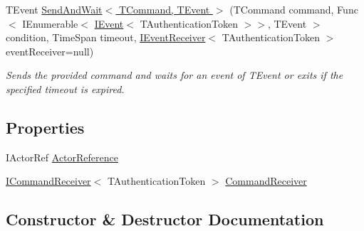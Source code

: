 \begin{DoxyCompactItemize}
T\+Event \hyperlink{classCqrs_1_1Akka_1_1Commands_1_1ConcurrentAkkaCommandSender_afda9034e20ed82cd3742f1489ebe1b3a_afda9034e20ed82cd3742f1489ebe1b3a}{Send\+And\+Wait$<$ T\+Command, T\+Event $>$} (T\+Command command, Func$<$ I\+Enumerable$<$ \hyperlink{interfaceCqrs_1_1Events_1_1IEvent}{I\+Event}$<$ T\+Authentication\+Token $>$$>$, T\+Event $>$ condition, Time\+Span timeout, \hyperlink{interfaceCqrs_1_1Events_1_1IEventReceiver}{I\+Event\+Receiver}$<$ T\+Authentication\+Token $>$ event\+Receiver=null)
\begin{DoxyCompactList}\small\item\em Sends the provided {\itshape command}  and waits for an event of {\itshape T\+Event}  or exits if the specified timeout is expired. \end{DoxyCompactList}\end{DoxyCompactItemize}
\subsection*{Properties}
\begin{DoxyCompactItemize}
\item 
I\+Actor\+Ref \hyperlink{classCqrs_1_1Akka_1_1Commands_1_1ConcurrentAkkaCommandSender_a6c5acb131074e98841ddac12da654969_a6c5acb131074e98841ddac12da654969}{Actor\+Reference}
\item 
\hyperlink{interfaceCqrs_1_1Commands_1_1ICommandReceiver}{I\+Command\+Receiver}$<$ T\+Authentication\+Token $>$ \hyperlink{classCqrs_1_1Akka_1_1Commands_1_1ConcurrentAkkaCommandSender_a37bf6191b21d98e14d9070b36bb2d0fe_a37bf6191b21d98e14d9070b36bb2d0fe}{Command\+Receiver}
\end{DoxyCompactItemize}


\subsection{Constructor \& Destructor Documentation}
\mbox{\label{classCqrs_1_1Akka_1_1Commands_1_1ConcurrentAkkaCommandSender_a203cd12567f100fb3545b029f6ed0181_a203cd12567f100fb3545b029f6ed0181}} 
